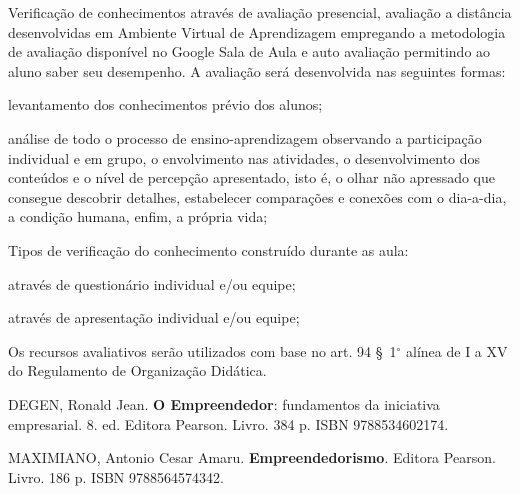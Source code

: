 \begin{pud}
	\avaliacao
	Verificação de conhecimentos através de avaliação presencial, avaliação a distância desenvolvidas em Ambiente Virtual de Aprendizagem empregando a metodologia de avaliação disponível no Google Sala de Aula e auto avaliação permitindo ao aluno saber seu desempenho.
	A avaliação será desenvolvida nas seguintes formas:
		\begin{description}[itemsep=0em]
            \item[$\bullet$ Diagnóstica --] levantamento dos conhecimentos prévio dos alunos;
            \item[$\bullet$ Continuada --] análise de todo o processo de ensino-aprendizagem observando a participação individual e em grupo, o envolvimento nas atividades, o desenvolvimento dos conteúdos e o nível de percepção apresentado, isto é, o olhar não apressado que consegue descobrir detalhes, estabelecer comparações e conexões com o dia-a-dia, a condição humana, enfim, a própria vida;            
        \end{description}
        
        Tipos de verificação do conhecimento construído durante as aula: 
	    \begin{description}[itemsep=0em]
            \item[$\bullet$ Escrita,] através de questionário individual e/ou equipe;
            \item[$\bullet$ Oral,] através de apresentação individual e/ou equipe;
            
        \end{description}
		Os recursos avaliativos serão utilizados com base  no art. 94 \S~1$^\circ$ alínea de I a XV do Regulamento de Organização Didática.
	\naopresencial

	\begin{bibbasica}
		\item DEGEN, Ronald Jean. \textbf{O Empreendedor}: fundamentos da iniciativa empresarial. 8. ed. Editora Pearson. Livro. 384 p. ISBN 9788534602174.   %
        
		\item MAXIMIANO, Antonio Cesar Amaru. \textbf{Empreendedorismo}. Editora Pearson. Livro. 186 p. ISBN 9788564574342.  
		

\end{bibbasica}
\end{pud}
